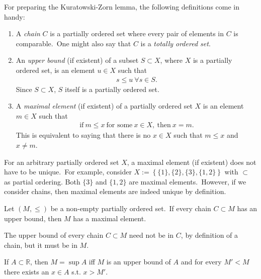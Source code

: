 \begin{defn}
	For preparing the Kuratowski-Zorn lemma, the following definitions come in handy: 
	\begin{enumerate}[label=\alph*)]
		\item A \textit{chain} $C$ is a partially ordered set where every pair of elements in $C$ is comparable.\ One might also say that $C$ is a \textit{totally ordered set}. 
		\item An \textit{upper bound} (if existent)  of a subset $S\subset X$, where $X$ is a partially ordered set, is an element $u\in X$ such that 
		\begin{align}
			s \leq u \ \forall s\in S. 
		\end{align}
		Since $S\subset X$, $S$ itself is a partially ordered set. 
		\item A \textit{maximal element} (if existent) of a partially ordered set $X$ is an element $m\in X$ such that 
		\begin{align}
			\text{if}\ m\leq x \ \text{for some}\ x\in X,\ \text{then}\ x=m.
		\end{align}
		This is equivalent to saying that there is no $x\in X$ such that $m\leq x$ and $x\ne m$. 
	\end{enumerate}
\end{defn}

\begin{remark}
	For an arbitrary partially ordered set $X$, a maximal element (if existent) does not have to be unique.\ For example, consider $X := \left\{ \{1\}, \{2\}, \{3\}, \{1, 2\} \right\}$ with $\subset$ as partial ordering. Both $\{3\}$ and $\{1, 2\}$ are maximal elements.\ However, if we consider chains, then maximal elements are indeed unique by definition. 
\end{remark}

\begin{theorem}
	Let $\left(M, \leq\right)$ be a non-empty partially ordered set.\ If every chain $C\subset M$ has an upper bound, then $M$ has a maximal element. 
\end{theorem}

\begin{remark}
	The upper bound of every chain $C\subset M$ need not be in $C$, by definition of a chain, but it must be in $M$. 
\end{remark}

\begin{theorem}\label{thrm:supremum_characterization}
	If $A\subset \mathbb R$, then $M = \sup A$ iff $M$ is an upper bound of $A$ and for every $M' < M$ there exists an $x\in A$ s.t. $x > M'$. 
\end{theorem}

